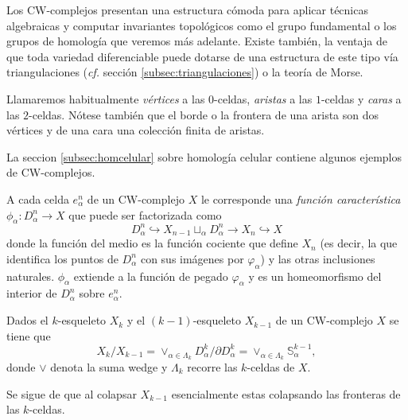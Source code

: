 Los CW-complejos presentan una estructura cómoda para aplicar técnicas algebraicas y computar invariantes topológicos como el grupo fundamental o los grupos de homología que veremos más adelante. Existe también, la ventaja de que toda variedad diferenciable puede dotarse de una estructura de este tipo vía triangulaciones (\textit{cf.} sección \ref{subsec:triangulaciones}) o la teoría de Morse.

\begin{nota}
    Llamaremos habitualmente \textit{vértices} a las $0$-celdas, \textit{aristas} a las $1$-celdas y \textit{caras} a las $2$-celdas. Nótese también que el borde o la frontera de una arista son dos vértices y de una cara una colección finita de aristas.
\end{nota}

La seccion \ref{subsec:homcelular} sobre homología celular contiene algunos ejemplos de CW-complejos.

\begin{definition}
    A cada celda $e^n_{\alpha}$ de un CW-complejo $X$ le corresponde una \textit{función característica} $\phi_{\alpha} : D^n_{\alpha}\to X$ que puede ser factorizada como
    \begin{equation*}
        D^n_{\alpha} \hookrightarrow X_{n-1} \sqcup_{\alpha} D^n_{\alpha} \to X_n \hookrightarrow X
    \end{equation*}
    donde la función del medio es la función cociente que define $X_n$ (es decir, la que identifica los puntos de $D^n_{\alpha}$ con sus imágenes por $\varphi_{\alpha}$) y las otras inclusiones naturales. $\phi_{\alpha}$ extiende a la función de pegado $\varphi_{\alpha}$ y es un homeomorfismo del interior de $D^n_{\alpha}$ sobre $e^n_{\alpha}$.

\end{definition}


\begin{proposition}
    Dados el $k$-esqueleto $X_k$ y el $(k-1)$-esqueleto $X_{k-1}$ de un CW-complejo $X$ se tiene que 
    \begin{equation*}
        X_k/X_{k-1} = \vee_{\alpha\in\Lambda_k} D^k_{\alpha}/\partial D^k_{\alpha} = \vee_{\alpha\in\Lambda_k} \mathbb{S}^{k-1}_{\alpha},
    \end{equation*}
    donde $\vee$ denota la suma wedge y $\Lambda_k$ recorre las $k$-celdas de $X$.
\end{proposition}

{\color{blue} Se sigue de que al colapsar $X_{k-1}$ esencialmente estas colapsando las fronteras de las $k$-celdas.}